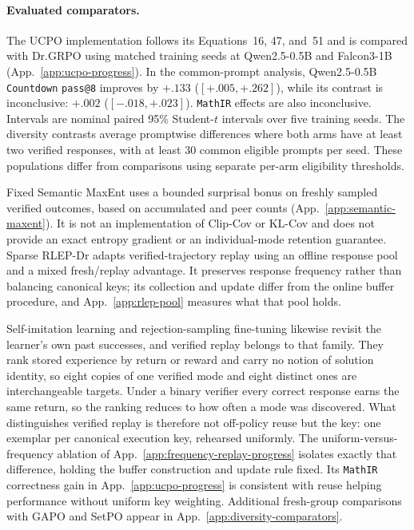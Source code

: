 \paragraph{Evaluated comparators.}
The UCPO implementation follows its Equations~16, 47, and~51 and is compared
with Dr.GRPO using matched training seeds at Qwen2.5-0.5B and Falcon3-1B
(App.~\ref{app:ucpo-progress}). In the common-prompt analysis, Qwen2.5-0.5B
\texttt{Countdown} \texttt{pass@8} improves by $+.133$ ($[+.005,+.262]$), while its
\pmd{} contrast is inconclusive: $+.002$ ($[-.018,+.023]$). \texttt{MathIR} effects
are also inconclusive. Intervals are nominal paired 95\% Student-$t$
intervals over five training seeds. The diversity contrasts average promptwise
differences where both arms have at least two verified responses, with at
least 30 common eligible prompts per seed. These populations differ from
comparisons using separate per-arm eligibility thresholds.

Fixed Semantic MaxEnt uses a bounded surprisal bonus on freshly sampled
verified outcomes, based on accumulated and peer counts
(App.~\ref{app:semantic-maxent}). It is not an implementation of Clip-Cov
or KL-Cov and does not provide an exact entropy gradient or an individual-mode
retention guarantee. Sparse RLEP-Dr adapts verified-trajectory replay
\citep{zhang2025rlep} using an offline response pool and a mixed fresh/replay
advantage. It preserves response frequency rather than balancing canonical
keys; its collection and update differ from the online buffer procedure, and
App.~\ref{app:rlep-pool} measures what that pool holds.

Self-imitation learning \citep{oh2018self} and rejection-sampling fine-tuning
\citep{dong2023raft} likewise revisit the learner's own past successes, and
verified replay belongs to that family. They rank stored experience by return
or reward and carry no notion of solution identity, so eight copies of one
verified mode and eight distinct ones are interchangeable targets. Under a
binary verifier every correct response earns the same return, so the ranking
reduces to how often a mode was discovered. What distinguishes verified replay
is therefore not off-policy reuse but the key: one exemplar per canonical
execution key, rehearsed uniformly. The uniform-versus-frequency ablation of
App.~\ref{app:frequency-replay-progress} isolates exactly that difference,
holding the buffer construction and update rule fixed.
Its \texttt{MathIR} correctness gain in App.~\ref{app:ucpo-progress} is consistent
with reuse helping performance without uniform key weighting.
Additional fresh-group comparisons with GAPO and SetPO appear in
App.~\ref{app:diversity-comparators}.

